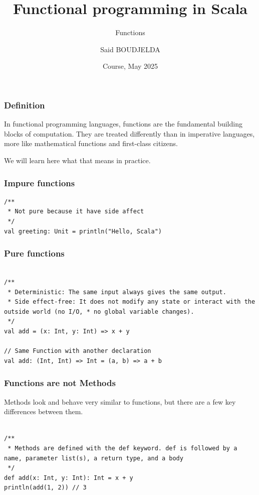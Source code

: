 \documentclass{beamer}
\title[Scala] %
{Functional programming in Scala}
\subtitle{Functions}
\author[Said BOUDJELDA] %
{Said BOUDJELDA}
\institute[sciam] %
{
  Senior Software Engineer @SCIAM\\
  Email : mohamed-said.boudjelda@intervenants.efrei.net \\ 
  Follow me on GitHub @bmscomp
}
\date[efrei 2025] %
{Course, May 2025}
\begin{document}
\frame{\titlepage}


\begin{frame}
\frametitle{Definition}

In functional programming languages, functions are the fundamental building blocks of computation. They are treated differently than in imperative languages, more like mathematical functions and first-class citizens. 

We will learn here what that means in practice.

\end{frame}

\begin{frame}[fragile]
\frametitle{Impure functions}

\begin{lstlisting}[style=scalaStyle]
/**
 * Not pure because it have side affect 
 */
val greeting: Unit = println("Hello, Scala") 

\end{lstlisting}

\end{frame}



\begin{frame}[fragile]
\frametitle{Pure functions}

\begin{lstlisting}[style=scalaStyle]

/**
 * Deterministic: The same input always gives the same output.
 * Side effect-free: It does not modify any state or interact with the outside world (no I/O, * no global variable changes).
 */
val add = (x: Int, y: Int) => x + y

// Same Function with another declaration
val add: (Int, Int) => Int = (a, b) => a + b

\end{lstlisting}

\end{frame}

\begin{frame}[fragile]
\frametitle{Functions are not Methods}

Methods look and behave very similar to functions, but there are a few key differences between them.


\begin{lstlisting}[style=scalaStyle]

/**
 * Methods are defined with the def keyword. def is followed by a name, parameter list(s), a return type, and a body
 */
def add(x: Int, y: Int): Int = x + y
println(add(1, 2)) // 3

\end{lstlisting}

\end{frame}
\end{document}
